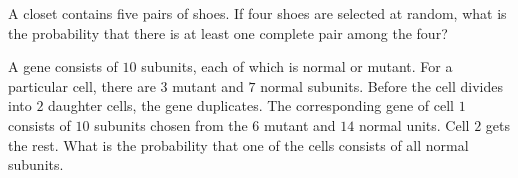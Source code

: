 \begin{problem}
  A closet contains five pairs of shoes. If four shoes are selected at
  random, what is the probability that there is at least one complete pair
  among the four?
\end{problem}
\begin{solution}
\end{solution}

\begin{problem}
  A gene consists of \(10\) subunits, each of which is normal or
  mutant. For a particular cell, there are \(3\) mutant and \(7\) normal
  subunits. Before the cell divides into \(2\) daughter cells, the gene
  duplicates. The corresponding gene of cell \(1\) consists of \(10\)
  subunits chosen from the \(6\) mutant and \(14\) normal units. Cell \(2\)
  gets the rest. What is the probability that one of the cells consists of
  all normal subunits.
\end{problem}
\begin{solution}
\end{solution}

